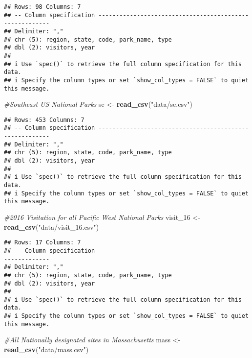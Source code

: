 \documentclass[
]{article}
\newenvironment{Shaded}{\begin{snugshade}}{\end{snugshade}}
\newcommand{\CommentTok}[1]{\textcolor[rgb]{0.56,0.35,0.01}{\textit{#1}}}
\newcommand{\FunctionTok}[1]{\textcolor[rgb]{0.13,0.29,0.53}{\textbf{#1}}}
\newcommand{\NormalTok}[1]{#1}
\newcommand{\OtherTok}[1]{\textcolor[rgb]{0.56,0.35,0.01}{#1}}
\newcommand{\StringTok}[1]{\textcolor[rgb]{0.31,0.60,0.02}{#1}}
\begin{document}
\begin{verbatim}
## Rows: 98 Columns: 7
## -- Column specification --------------------------------------------------------
## Delimiter: ","
## chr (5): region, state, code, park_name, type
## dbl (2): visitors, year
## 
## i Use `spec()` to retrieve the full column specification for this data.
## i Specify the column types or set `show_col_types = FALSE` to quiet this message.
\end{verbatim}

\begin{Shaded}
\begin{Highlighting}[]
 \CommentTok{\#Southeast US National Parks}
\NormalTok{ se }\OtherTok{\textless{}{-}} \FunctionTok{read\_csv}\NormalTok{(}\StringTok{"data/se.csv"}\NormalTok{)}
\end{Highlighting}
\end{Shaded}

\begin{verbatim}
## Rows: 453 Columns: 7
## -- Column specification --------------------------------------------------------
## Delimiter: ","
## chr (5): region, state, code, park_name, type
## dbl (2): visitors, year
## 
## i Use `spec()` to retrieve the full column specification for this data.
## i Specify the column types or set `show_col_types = FALSE` to quiet this message.
\end{verbatim}

\begin{Shaded}
\begin{Highlighting}[]
 \CommentTok{\#2016 Visitation for all Pacific West National Parks}
\NormalTok{ visit\_16 }\OtherTok{\textless{}{-}} \FunctionTok{read\_csv}\NormalTok{(}\StringTok{"data/visit\_16.csv"}\NormalTok{)}
\end{Highlighting}
\end{Shaded}

\begin{verbatim}
## Rows: 17 Columns: 7
## -- Column specification --------------------------------------------------------
## Delimiter: ","
## chr (5): region, state, code, park_name, type
## dbl (2): visitors, year
## 
## i Use `spec()` to retrieve the full column specification for this data.
## i Specify the column types or set `show_col_types = FALSE` to quiet this message.
\end{verbatim}

\begin{Shaded}
\begin{Highlighting}[]
 \CommentTok{\#All Nationally designated sites in Massachusetts}
\NormalTok{ mass }\OtherTok{\textless{}{-}} \FunctionTok{read\_csv}\NormalTok{(}\StringTok{"data/mass.csv"}\NormalTok{)}
\end{Highlighting}
\end{Shaded}
\end{document}
